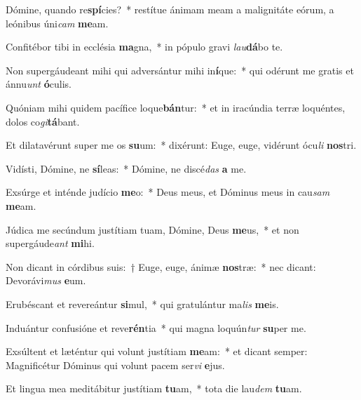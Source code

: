 \item Dómine, quando re\textbf{spí}cies?~* restítue ánimam meam a malignitáte eórum, a leónibus úni\textit{cam} \textbf{me}am.
\item Confitébor tibi in ecclésia \textbf{ma}gna,~* in pópulo gravi \textit{lau}\textbf{dá}bo te.
\item Non supergáudeant mihi qui adversántur mihi in\textbf{í}que:~* qui odérunt me gratis et ánnu\textit{unt} \textbf{ó}culis.
\item Quóniam mihi quidem pacífice loque\textbf{bán}tur:~* et in iracúndia terræ loquéntes, dolos co\textit{gi}\textbf{tá}bant.
\item Et dilatavérunt super me os \textbf{su}um:~* dixérunt: Euge, euge, vidérunt ócu\textit{li} \textbf{nos}tri.
\item Vidísti, Dómine, ne \textbf{sí}leas:~* Dómine, ne discé\textit{das} \textbf{a} me.
\item Exsúrge et inténde judício \textbf{me}o:~* Deus meus, et Dóminus meus in cau\textit{sam} \textbf{me}am.
\item Júdica me secúndum justítiam tuam, Dómine, Deus \textbf{me}us,~* et non supergáude\textit{ant} \textbf{mi}hi.
\item Non dicant in córdibus suis:~† Euge, euge, ánimæ \textbf{nos}træ:~* nec dicant: Devorávi\textit{mus} \textbf{e}um.
\item Erubéscant et revereántur \textbf{si}mul,~* qui gratulántur ma\textit{lis} \textbf{me}is.
\item Induántur confusióne et reve\textbf{rén}tia~* qui magna loquún\textit{tur} \textbf{su}per me.
\item Exsúltent et læténtur qui volunt justítiam \textbf{me}am:~* et dicant semper: Magnificétur Dóminus qui volunt pacem ser\textit{vi} \textbf{e}jus.
\item Et lingua mea meditábitur justítiam \textbf{tu}am,~* tota die lau\textit{dem} \textbf{tu}am.
